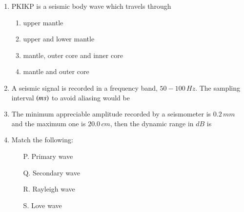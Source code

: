 \documentclass[12pt,fleqn]{article}
\theoremstyle{remark}
\begin{document}
\begin{enumerate}[label=Q.\arabic*.,font=\bfseries, start = 21]
    \item PKIKP is a seismic body wave which travels through \hfill{} 
            \begin{enumerate}
                \item upper mantle
                \item upper and lower mantle
                \item mantle, outer core and inner core
                \item mantle and outer core                
            \end{enumerate}
    \item A seismic signal is recorded in a frequency band, $50-100\,Hz$. The sampling interval $\left(ms\right)$ to avoid aliasing would be \hfill{} 
            \begin {enumerate}
            \end{enumerate}
    \item The minimum appreciable amplitude recorded by a seismometer is $0.2\,mm$ and the maximum one is $20.0\,cm$, then the dynamic range in $dB$ is \hfill{} 
            \begin {enumerate}
            \end{enumerate}
    \item Match the following: \hfill{} 
                    
            \begin{multicols}{2}
            \begin{itemize}
                \item [P.] Primary wave
                \item [Q.] Secondary wave
                \item [R.] Rayleigh wave
                \item [S.] Love wave
            \end{itemize}


\end{multicols}
\end{enumerate}
\end{document}
